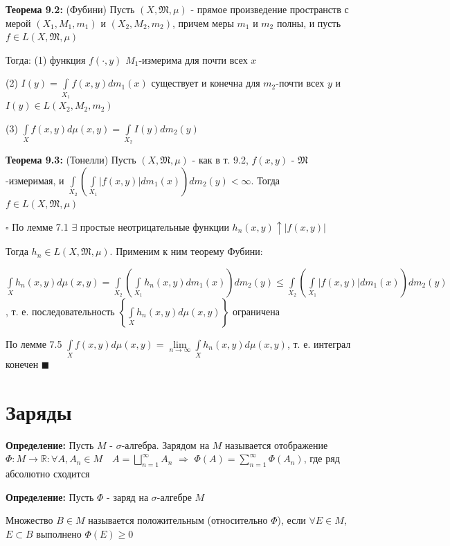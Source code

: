 \documentclass[a4paper]{report}
\begin{document}
\noindent\textbf{Теорема 9.2:} (Фубини) Пусть $(X,\mathfrak M,\mu)$ - прямое произведение пространств с мерой $(X_1,M_1,m_1)$ и $(X_2,M_2,m_2)$, причем меры $m_1$ и $m_2$ полны, и пусть $f\in L(X,\mathfrak M,\mu)$

 Тогда: (1) функция $f(\cdot,y)$ $M_1$-измерима для почти всех $x$

(2) $I(y)=\displaystyle\int\limits_{X_1}f(x,y)dm_1(x)$ существует и конечна для $m_2$-почти всех $y$ и $I(y)\in L(X_2,M_2,m_2)$

(3) $\displaystyle\int\limits_X f(x,y)d\mu(x,y)=\displaystyle\int\limits_{X_2}I(y)dm_2(y)$
\bigskip

\noindent\textbf{Теорема 9.3:} (Тонелли) Пусть $(X,\mathfrak M,\mu)$ - как в т. 9.2, $f(x,y)$ - $\mathfrak M$-измеримая, и $\displaystyle\int\limits_{X_2}\left(\displaystyle\int\limits_{X_1}
|f(x,y)|dm_1(x)\right)dm_2(y)<\infty$. Тогда $f\in L(X,\mathfrak M,\mu)$

\noindent $\square$ По лемме 7.1 $\exists$ простые неотрицательные функции $h_n(x,y)\uparrow|f(x,y)|$

Тогда $h_n\in L(X,\mathfrak M,\mu)$. Применим к ним теорему Фубини:

$\displaystyle\int\limits_X h_n(x,y)d\mu(x,y)=\displaystyle\int\limits_{X_2}\left(\displaystyle\int\limits_{X_1}h_n(x,y)dm_1(x)\right)dm_2(y)\le\displaystyle\int\limits_{X_2}\left(\displaystyle\int\limits_{X_1}|f(x,y)|dm_1(x)\right)dm_2(y)$, т. е. последовательность $\left\{\displaystyle\int\limits_X h_n(x,y)d\mu(x,y)\right\}$ ограничена

По лемме 7.5 $\displaystyle\int\limits_X f(x,y)d\mu(x,y)=\lim\limits_{n\to\infty}\displaystyle\int\limits_X h_n(x,y)d\mu(x,y)$, т. е. интеграл конечен $\blacksquare$





\chapter{Заряды}

\noindent\textbf{Определение:} Пусть $M$ - $\sigma$-алгебра. Зарядом на $M$ называется отображение $\Phi\colon M\to\mathbb R\colon\forall A,A_n\in M\quad A=\bigsqcup\limits_{n=1}^\infty A_n$ $\Rightarrow$ $\Phi(A)=\sum\limits_{n=1}^\infty\Phi(A_n)$, где ряд абсолютно сходится
\bigskip

\noindent\textbf{Определение:} Пусть $\Phi$ - заряд на $\sigma$-алгебре $M$

Множество $B\in M$ называется положительным (относительно $\Phi$), если $\forall E\in M$, $E\subset B$ выполнено $\Phi(E)\ge0$
\end{document}
